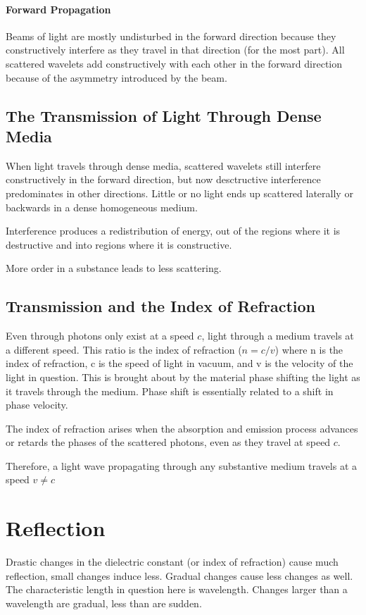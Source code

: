 \documentclass[12pt]{report}
\begin{document}
\paragraph{Forward Propagation}
Beams of light are mostly undisturbed in the forward direction because they constructively interfere as they travel in that direction (for the most part). All scattered wavelets add constructively with each other in the forward direction because of the asymmetry introduced by the beam. 
\subsection{The Transmission of Light Through Dense Media}
When light travels through dense media, scattered wavelets still interfere constructively in the forward direction, but now desctructive interference predominates in other directions. Little or no  light ends up scattered laterally or backwards in a dense homogeneous medium. 

Interference produces a redistribution of energy, out of the regions where it is destructive and into regions where it is constructive. 

More order in a substance leads to less scattering. 
\subsection{Transmission and the Index of Refraction}
Even through photons only exist at a speed $c$, light through a medium travels at a different speed. This ratio is the index of refraction ($n = c/v$) where n is the index of refraction, c is the speed of light in vacuum, and v is the velocity of the light in question. This is brought about by the material phase shifting the light as it travels through the medium. Phase shift is essentially related to a shift in phase velocity. 

The index of refraction arises when the absorption and emission process advances or retards the phases of the scattered photons, even as they travel at speed $c$.

Therefore, a light wave propagating through any substantive medium travels at a speed $v \neq c$

\section{Reflection}
Drastic changes in the dielectric constant (or index of refraction) cause much reflection, small changes induce less. Gradual changes cause less changes as well. The characteristic length in question here is wavelength. Changes larger than a wavelength are gradual, less than are sudden. 
\end{document}
